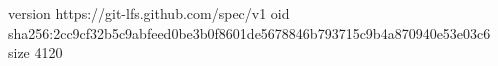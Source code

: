 version https://git-lfs.github.com/spec/v1
oid sha256:2cc9cf32b5c9abfeed0be3b0f8601de5678846b793715c9b4a870940e53e03c6
size 4120
